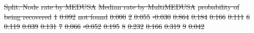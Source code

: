 \documentclass[10pt,letterpaper]{article} %
\providecommand{\DIFdel}[1]{{\protect\color{red}\sout{#1}}}                      %
\begin{document}
{%
}
\DIFdel{Split. Node }%
\DIFdel{rate by MEDUSA }%
\DIFdel{Median rate by MultiMEDUSA }%
\DIFdel{probability of being recovered }%
\DIFdel{1          }%
\DIFdel{0.092          }%
\DIFdel{not found                  }%
\DIFdel{0.000                          }%
\DIFdel{2          }%
\DIFdel{0.055          }%
\DIFdel{-0.030                     }%
\DIFdel{0.864                          }%
\DIFdel{0.184          }%
\DIFdel{0.166          }%
\DIFdel{0.111          }%
\DIFdel{6          }%
\DIFdel{0.119          }%
\DIFdel{0.039                      }%
\DIFdel{0.131                          }%
\DIFdel{7          }%
\DIFdel{0.066          }%
\DIFdel{-0.052                     }%
\DIFdel{0.195                          }%
\DIFdel{8          }%
\DIFdel{0.232          }%
\DIFdel{0.166                      }%
\DIFdel{0.319                          }%
\DIFdel{9          }%
\DIFdel{0.042          }%
\end{document}
